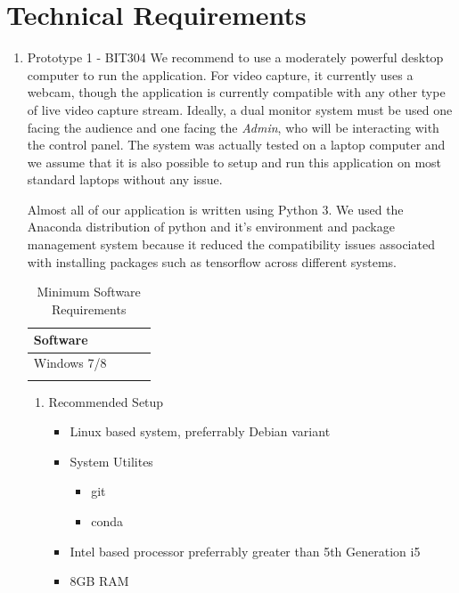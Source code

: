 \documentclass[12pt,a4paper,man]{report}
\begin{document}
\section{Technical Requirements}
\label{sec:orgb3e9e16}
\begin{enumerate}
\item Prototype 1 - BIT304
\label{sec:orgacf69ca}
We recommend to use a moderately powerful desktop computer to run the application. For video capture, it currently uses a webcam, though the application is currently compatible with any other type of live video capture stream. Ideally, a dual monitor system must be used one facing the audience and one facing the \emph{Admin}, who will be interacting with the control panel. The system was actually tested on a laptop computer and we assume that it is also possible to setup and run this application on most standard laptops without any issue. 

Almost all of our application is written using Python 3. We used the Anaconda distribution of python and it's environment and package management system because it reduced the compatibility issues associated with installing packages such as tensorflow across different systems. 

\begin{table}[htbp]
\caption{\label{table:minreq1}
Minimum Software Requirements}
\centering
\begin{tabular}{|l|l|lp{3cm}|}
Software\\
\hline
Windows 7/8\\
\\
\end{tabular}
\end{table}

\begin{enumerate}
\item Recommended Setup
\label{sec:orgedfe66c}
\begin{itemize}
\item Linux based system, preferrably Debian variant
\item System Utilites
\begin{itemize}
\item git
\item conda
\end{itemize}
\item Intel based processor preferrably greater than 5th Generation i5
\item 8GB RAM
\end{itemize}
\end{enumerate}
\end{enumerate}
\end{document}
